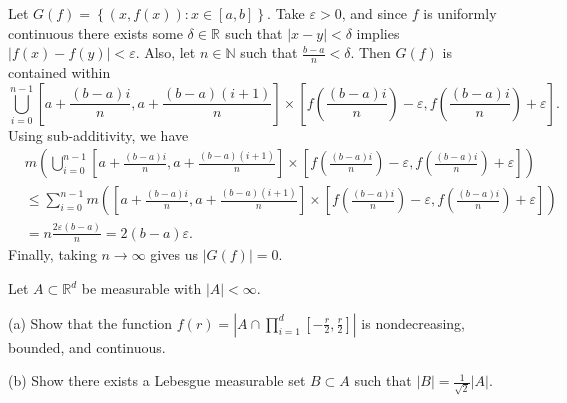 \begin{solution}
  Let $G(f) = \left\{ (x,f(x)) : x \in [a,b] \right\}$.
  Take $\varepsilon > 0$, and since $f$ is uniformly continuous there exists some $\delta \in \mathbb{R}^{}$ such that $\left| x - y \right| < \delta$ implies $\left| f(x) - f(y) \right|<\varepsilon$.
  Also, let $n \in \mathbb{N}$ such that $\frac{b-a}{n} < \delta$.
  Then $G(f)$ is contained within 
  \[
    \bigcup_{i=0}^{n-1} \left[a + \frac{(b-a)i}{n}, a + \frac{(b-a)(i+1)}{n} \right] \times \left[ f\left( \frac{(b-a)i}{n} \right) - \varepsilon, f\left( \frac{(b-a)i}{n}\right)  + \varepsilon \right]
  .\] 
  Using sub-additivity, we have
  \begin{equation*}
    \begin{split}
      &m\left( \bigcup_{i=0}^{n-1} \left[a + \frac{(b-a)i}{n}, a + \frac{(b-a)(i+1)}{n} \right] \times \left[ f\left( \frac{(b-a)i}{n} \right) - \varepsilon, f\left( \frac{(b-a)i}{n}\right)  + \varepsilon \right] \right) \\ 
      &\leq \sum_{i=0}^{n-1} m\left(  \left[a + \frac{(b-a)i}{n}, a + \frac{(b-a)(i+1)}{n} \right] \times \left[ f\left( \frac{(b-a)i}{n} \right) - \varepsilon, f\left( \frac{(b-a)i}{n}\right)  + \varepsilon \right] \right)\\
      &= n \frac{2\varepsilon(b-a)}{n} = 2(b-a)\varepsilon.
    \end{split}
  \end{equation*}
  Finally, taking $n \to \infty$ gives us $\left| G(f) \right| = 0$.

\end{solution}

\pagebreak

\begin{problem}{3}
Let $A \subset \mathbb{R}^{d}$ be measurable with $|A| < \infty$.

(a) Show that the function $f(r) = \left| A \cap \prod_{i=1}^{d } [-\frac{r}{2}, \frac{r}{2}] \right|$ is nondecreasing, bounded, and continuous.

(b) Show there exists a Lebesgue measurable set $B \subset A$ such that $\left| B \right| = \frac{1}{\sqrt{2} } \left| A \right|$.
\end{problem}

